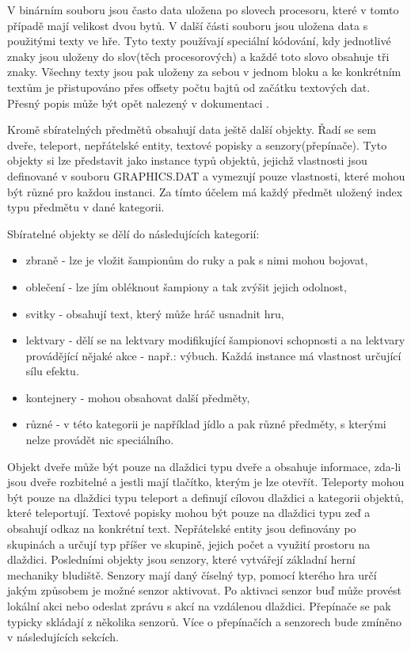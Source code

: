 V binárním souboru jsou často data uložena po slovech procesoru, které v tomto případě mají velikost dvou bytů. 
V další části souboru jsou uložena data s použitými texty ve hře. Tyto texty používají speciální kódování,
kdy jednotlivé znaky jsou uloženy do slov(těch procesorových) a každé toto slovo obsahuje tři znaky. Všechny 
texty jsou pak uloženy za sebou v jednom bloku a ke konkrétním textům je přistupováno přes offsety počtu bajtů
od začátku textových dat. Přesný popis může být opět nalezený v dokumentaci .

Kromě sbíratelných předmětů obsahují data ještě další objekty. Řadí se sem dveře, 
teleport, nepřátelské entity, textové popisky a senzory(přepínače). Tyto objekty si lze představit jako instance typů objektů, 
jejichž vlastnosti jsou definované v souboru GRAPHICS.DAT a vymezují pouze vlastnosti, které mohou být různé pro každou instanci.
Za tímto účelem má každý předmět uložený index typu předmětu v dané kategorii.  

Sbíratelné objekty se dělí do následujících kategorií:
\begin{itemize}
\item zbraně - lze je vložit šampionům do ruky a pak s nimi mohou bojovat,
\item oblečení - lze jím obléknout šampiony a tak zvýšit jejich odolnost,
\item svitky - obsahují text, který může hráč usnadnit hru, 
\item lektvary - dělí se na lektvary modifikující šampionovi schopnosti a na lektvary provádějící nějaké
	akce - např.: výbuch. Každá instance má vlastnost určující sílu efektu.
\item kontejnery - mohou obsahovat další předměty,
\item různé - v této kategorii je například jídlo a pak různé předměty, s kterými nelze provádět nic speciálního.
\end{itemize}


Objekt dveře může být pouze na dlaždici typu dveře a obsahuje informace, zda-li jsou dveře rozbitelné a jestli 
mají tlačítko, kterým je lze otevřít. Teleporty mohou být pouze na dlaždici typu teleport a 
definují cílovou dlaždici a kategorii objektů, které teleportují. Textové popisky mohou být pouze na 
dlaždici typu zeď a obsahují odkaz na konkrétní text. Nepřátelské entity jsou definovány po skupinách a určují 
typ příšer ve skupině, jejich počet a využití prostoru na dlaždici. Posledními objekty jsou senzory, 
které vytvářejí základní herní mechaniky bludiště. Senzory mají daný číselný typ, pomocí kterého hra 
určí jakým způsobem je možné senzor
aktivovat. Po aktivaci senzor buď může provést lokální akci nebo odeslat zprávu s akcí na vzdálenou 
dlaždici. Přepínače se pak typicky skládají z několika senzorů. Více o přepínačích a senzorech bude zmíněno
v následujících sekcích. 

